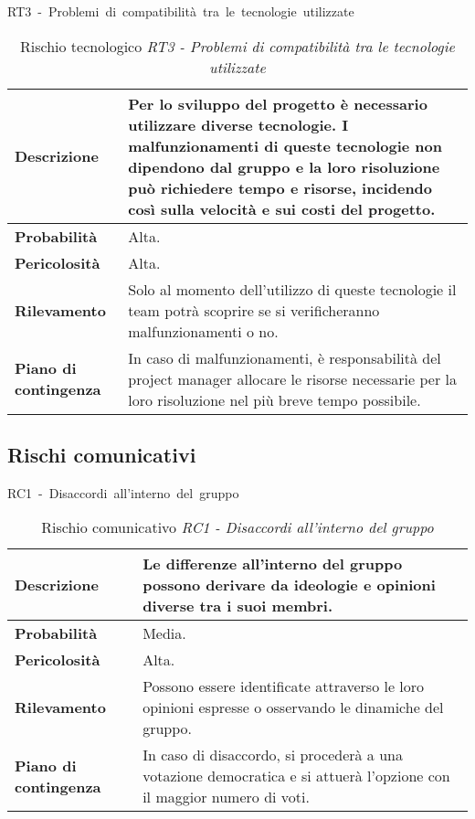 \begin{table}[!h]
    \centering
    \hbox{RT3 - Problemi di compatibilità tra le tecnologie utilizzate}
    \vspace{0.3cm}
	\begin{tabular}{|l|p{10cm}|} 
		\hline
		\textbf{Descrizione} & Per lo sviluppo del progetto è necessario utilizzare diverse tecnologie. I malfunzionamenti di queste tecnologie non dipendono dal gruppo e la loro risoluzione può richiedere tempo e risorse, incidendo così sulla velocità e sui costi del progetto. 
        \\ 
        \hline
        \textbf{Probabilità} & Alta. \\
        \hline
        \textbf{Pericolosità} & Alta. \\
        \hline
        \textbf{Rilevamento} & Solo al momento dell'utilizzo di queste tecnologie il team potrà scoprire se si verificheranno malfunzionamenti o no.  \\
        \hline
        \textbf{Piano di contingenza} & In caso di malfunzionamenti, è responsabilità del project manager allocare le risorse necessarie per la loro risoluzione nel più breve tempo possibile.\\
		\hline
	\end{tabular}
    \caption{Rischio tecnologico \textit{RT3 - Problemi di compatibilità tra le tecnologie utilizzate}}
    \label{table:7}

\end{table}



\begin{table}[!h]
    \subsection{Rischi comunicativi}
    \centering
    \hbox{RC1 - Disaccordi all'interno del gruppo }
    \vspace{0.3cm}
	\begin{tabular}{|l|p{10cm}|} 
		\hline
		\textbf{Descrizione} & Le differenze all'interno del gruppo possono derivare da ideologie e opinioni diverse tra i suoi membri. \\ 
        \hline
        \textbf{Probabilità} & Media. \\
        \hline
        \textbf{Pericolosità} & Alta. \\
        \hline
        \textbf{Rilevamento} & Possono essere identificate attraverso le loro opinioni espresse o osservando le dinamiche del gruppo. \\
        \hline
        \textbf{Piano di contingenza} & In caso di disaccordo, si procederà a una votazione democratica e si attuerà l'opzione con il maggior numero di voti. \\
		\hline
	\end{tabular}
    \caption{Rischio comunicativo \textit{RC1 - Disaccordi all'interno del gruppo}}
    \label{table:8}
\end{table}

